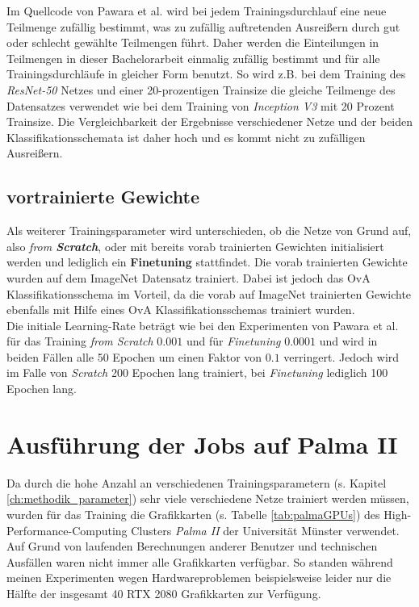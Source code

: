Im Quellcode von Pawara et al. \cite{pawaraWebsiteCode} wird bei jedem Trainingsdurchlauf eine neue Teilmenge zufällig bestimmt, was zu zufällig auftretenden Ausreißern durch gut oder schlecht gewählte Teilmengen führt.
Daher werden die Einteilungen in Teilmengen in dieser Bachelorarbeit einmalig zufällig bestimmt und für alle Trainingsdurchläufe in gleicher Form benutzt. So wird z.B. bei dem Training des \textit{ResNet-50} Netzes und einer 20-prozentigen Trainsize die gleiche Teilmenge des Datensatzes verwendet wie bei dem Training von \textit{Inception V3} mit 20 Prozent Trainsize. Die Vergleichbarkeit der Ergebnisse verschiedener Netze und der beiden Klassifikationsschemata ist daher hoch und es kommt nicht zu zufälligen Ausreißern.

\subsection{vortrainierte Gewichte}
Als weiterer Trainingsparameter wird unterschieden, ob die Netze von Grund auf, also \textit{from \textbf{Scratch}}, oder mit bereits vorab trainierten Gewichten initialisiert werden und lediglich ein \textbf{Finetuning} stattfindet. Die vorab trainierten Gewichte wurden auf dem ImageNet Datensatz \cite{imagenet} trainiert.
Dabei ist jedoch das OvA Klassifikationsschema im Vorteil, da die vorab auf ImageNet \cite{imagenet} trainierten Gewichte ebenfalls mit Hilfe eines OvA Klassifikationsschemas trainiert wurden.\\

Die initiale Learning-Rate beträgt wie bei den Experimenten von Pawara et al. \cite{pawaraPaper} für das Training \textit{from Scratch} $0.001$ und für \textit{Finetuning} $0.0001$ und wird in beiden Fällen alle 50 Epochen um einen Faktor von $0.1$ verringert. Jedoch wird im Falle von \textit{Scratch} 200 Epochen lang trainiert, bei \textit{Finetuning} lediglich 100 Epochen lang.



\section{Ausführung der Jobs auf Palma II}
\label{ch:methodik_palma}
Da durch die hohe Anzahl an verschiedenen Trainingsparametern (s. Kapitel \ref{ch:methodik_parameter}) sehr viele verschiedene Netze trainiert werden müssen, wurden für das Training die Grafikkarten (s. Tabelle \ref{tab:palmaGPUs}) des High-Performance-Computing Clusters \textit{Palma II} der Universität Münster \cite{palma2} verwendet.\\
Auf Grund von laufenden Berechnungen anderer Benutzer und technischen Ausfällen waren nicht immer alle Grafikkarten verfügbar. So standen während meinen Experimenten wegen Hardwareproblemen beispielsweise leider nur die Hälfte der insgesamt 40 RTX 2080 Grafikkarten zur Verfügung.

